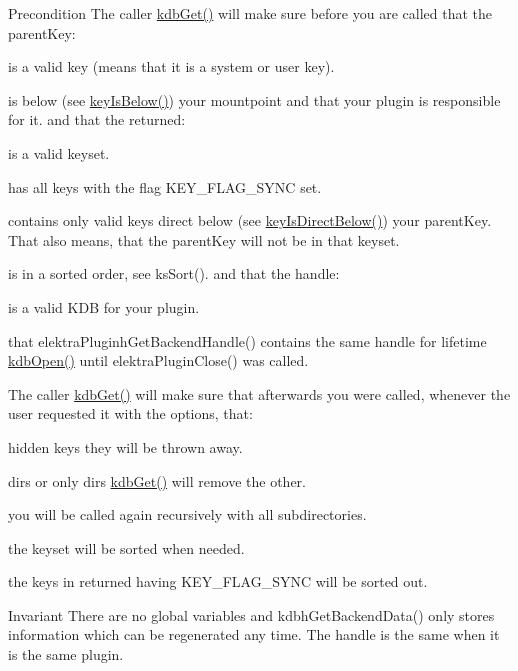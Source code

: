 \begin{DoxyPrecond}{Precondition}
The caller \hyperlink{group__kdb_ga28e385fd9cb7ccfe0b2f1ed2f62453a1}{kdbGet()} will make sure before you are called that the parentKey:
\begin{DoxyItemize}
\item is a valid key (means that it is a system or user key).
\item is below (see \hyperlink{group__keytest_ga03332b5d97c76a4fd2640aca4762b8df}{keyIsBelow()}) your mountpoint and that your plugin is responsible for it. and that the returned:
\item is a valid keyset.
\item has {\ttfamily all} keys with the flag KEY\_\-FLAG\_\-SYNC set.
\item contains only valid keys direct below (see \hyperlink{group__keytest_ga4f175aafd98948ce6c774f3bd92b72ca}{keyIsDirectBelow()}) your parentKey. That also means, that the parentKey will not be in that keyset.
\item is in a sorted order, see ksSort(). and that the handle:
\begin{DoxyItemize}
\item is a valid KDB for your plugin.
\item that elektraPluginhGetBackendHandle() contains the same handle for lifetime \hyperlink{group__kdb_ga6808defe5870f328dd17910aacbdc6ca}{kdbOpen()} until elektraPluginClose() was called.
\end{DoxyItemize}
\end{DoxyItemize}

The caller \hyperlink{group__kdb_ga28e385fd9cb7ccfe0b2f1ed2f62453a1}{kdbGet()} will make sure that afterwards you were called, whenever the user requested it with the options, that:
\begin{DoxyItemize}
\item hidden keys they will be thrown away.
\item dirs or only dirs \hyperlink{group__kdb_ga28e385fd9cb7ccfe0b2f1ed2f62453a1}{kdbGet()} will remove the other.
\item you will be called again recursively with all subdirectories.
\item the keyset will be sorted when needed.
\item the keys in returned having KEY\_\-FLAG\_\-SYNC will be sorted out.
\end{DoxyItemize}
\end{DoxyPrecond}
\begin{DoxyInvariant}{Invariant}
There are no global variables and kdbhGetBackendData() only stores information which can be regenerated any time. The handle is the same when it is the same plugin.
\end{DoxyInvariant}
